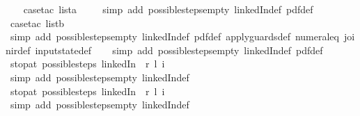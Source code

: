 \begin{isabellebody}
\ \ \isamarkupfalse%
\ {\isacharparenleft}case{\isacharunderscore}tac\ lista{\isacharparenright}\isanewline
\ \ \ \isamarkupfalse%
\ {\isacharparenleft}simp\ add{\isacharcolon}\ possible{\isacharunderscore}steps{\isacharunderscore}empty\ linkedIn{\isacharunderscore}def\ pdf{\isacharunderscore}def{\isacharparenright}\isanewline
\ \ \isamarkupfalse%
\ {\isacharparenleft}case{\isacharunderscore}tac\ listb{\isacharparenright}\isanewline
\ \ \isamarkupfalse%
\ {\isacharparenleft}simp\ add{\isacharcolon}\ possible{\isacharunderscore}steps{\isacharunderscore}empty\ linkedIn{\isacharunderscore}def\ pdf{\isacharunderscore}def\ apply{\isacharunderscore}guards{\isacharunderscore}def\ numeral{\isacharunderscore}{}{\isacharunderscore}eq{\isacharunderscore}{}\ join{\isacharunderscore}ir{\isacharunderscore}def\ input{}state{\isacharunderscore}def{\isacharparenright}\isanewline
\ \ \isamarkupfalse%
\ {\isacharparenleft}simp\ add{\isacharcolon}\ possible{\isacharunderscore}steps{\isacharunderscore}empty\ linkedIn{\isacharunderscore}def\ pdf{\isacharunderscore}def{\isacharparenright}%
\endisatagproof
{\isafoldproof}%
%
\isadelimproof
\isanewline
%
\endisadelimproof
\isanewline
{}\isamarkupfalse%
\ stop{\isacharunderscore}at{\isacharunderscore}{}{\isacharcolon}\ {\isachardoublequoteopen}possible{\isacharunderscore}steps\ linkedIn\ {}\ r\ l\ i\ {\isacharequal}\ {\isacharbraceleft}{\isacharbar}{\isacharbar}{\isacharbraceright}{\isachardoublequoteclose}\isanewline
%
\isadelimproof
\ \ %
\endisadelimproof
%
\isatagproof
{}\isamarkupfalse%
\ {\isacharparenleft}simp\ add{\isacharcolon}\ possible{\isacharunderscore}steps{\isacharunderscore}empty\ linkedIn{\isacharunderscore}def{\isacharparenright}%
\endisatagproof
{\isafoldproof}%
%
\isadelimproof
\isanewline
%
\endisadelimproof
\isanewline
{}\isamarkupfalse%
\ stop{\isacharunderscore}at{\isacharunderscore}{}{\isacharcolon}\ {\isachardoublequoteopen}possible{\isacharunderscore}steps\ linkedIn\ {}\ r\ l\ i\ {\isacharequal}\ {\isacharbraceleft}{\isacharbar}{\isacharbar}{\isacharbraceright}{\isachardoublequoteclose}\isanewline
%
\isadelimproof
\ \ %
\endisadelimproof
%
\isatagproof
{}\isamarkupfalse%
\ {\isacharparenleft}simp\ add{\isacharcolon}\ possible{\isacharunderscore}steps{\isacharunderscore}empty\ linkedIn{\isacharunderscore}def{\isacharparenright}%
\endisatagproof
{\isafoldproof}%
%
\isadelimproof
\isanewline

\end{isabellebody}
